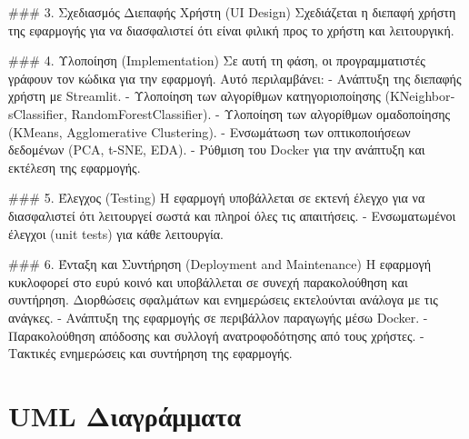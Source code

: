 \documentclass[a4paper,12pt]{article}
\begin{document}
\begin{itemize}
\par\vspace{10pt}

### 3. Σχεδιασμός Διεπαφής Χρήστη (\textlatin{UI Design})
Σχεδιάζεται η διεπαφή χρήστη της εφαρμογής για να διασφαλιστεί ότι είναι φιλική προς το χρήστη και λειτουργική.




\par\vspace{10pt}

### 4. Υλοποίηση (\textlatin{Implementation})
Σε αυτή τη φάση, οι προγραμματιστές γράφουν τον κώδικα για την εφαρμογή. Αυτό περιλαμβάνει:
- Ανάπτυξη της διεπαφής χρήστη με \textlatin{Streamlit}.
- Υλοποίηση των αλγορίθμων κατηγοριοποίησης (\textlatin{KNeighborsClassifier}, \textlatin{RandomForestClassifier}).
- Υλοποίηση των αλγορίθμων ομαδοποίησης (\textlatin{KMeans}, \textlatin{Agglomerative Clustering}).
- Ενσωμάτωση των οπτικοποιήσεων δεδομένων (\textlatin{PCA}, \textlatin{t-SNE}, \textlatin{EDA}).
- Ρύθμιση του \textlatin{Docker} για την ανάπτυξη και εκτέλεση της εφαρμογής.



\par\vspace{10pt}

### 5. Έλεγχος (\textlatin{Testing})
Η εφαρμογή υποβάλλεται σε εκτενή έλεγχο για να διασφαλιστεί ότι λειτουργεί σωστά και πληροί όλες τις απαιτήσεις.
- Ενσωματωμένοι έλεγχοι (\textlatin{unit tests}) για κάθε λειτουργία.




\par\vspace{10pt}

### 6. Ένταξη και Συντήρηση (\textlatin{Deployment and Maintenance})
Η εφαρμογή κυκλοφορεί στο ευρύ κοινό και υποβάλλεται σε συνεχή παρακολούθηση και συντήρηση. Διορθώσεις σφαλμάτων και ενημερώσεις εκτελούνται ανάλογα με τις ανάγκες.
- Ανάπτυξη της εφαρμογής σε περιβάλλον παραγωγής μέσω \textlatin{Docker}.
- Παρακολούθηση απόδοσης και συλλογή ανατροφοδότησης από τους χρήστες.
- Τακτικές ενημερώσεις και συντήρηση της εφαρμογής.



\par\vspace{10pt}

\section{UML Διαγράμματα}
\label{sec:uml}


\end{itemize}
\end{document}
